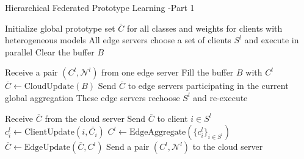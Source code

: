 \documentclass{article}
\begin{document}
\begin{algorithm}[H]
    \caption{Hierarchical Federated Prototype Learning -Part 1}
    \begin{algorithmic}[1]

        \State Initialize global prototype set \( \bar{C}\) for all classes and weights for clients with heterogeneous models
        \State All edge servers choose a set of clients $S^l$ and execute in parallel
        \State Clear the buffer \(B\)

        \State Receive a pair \( (C^l, \mathcal{N}^l) \) from one edge server
        \State Fill the buffer \(B\) with \( C^l \)
        \EndWhile
        \State \( \bar{C} \gets \text{CloudUpdate}(B) \)
        \State Send \( \bar{C} \) to edge servers participating in the current global aggregation
        \State These edge servers rechoose $S^l$ and re-execute
        \EndFor
        \EndProcedure

        \State Receive \( \bar{C} \) from the cloud server
         
        \State Send \( \bar{C} \) to client \( i \in S^{l} \)
        \State \( c^l_i \gets \text{ClientUpdate}(i, \bar{C_i}) \)
        \EndFor
        \State \( C^l \gets \text{EdgeAggregate}(\{ c^l_i \}_{i \in S^{l}}) \)
        \State \( \bar{C} \gets \text{EdgeUpdate}(\bar{C}, C^l) \) 
        \EndFor
        \State Send a pair \( (C^l, \mathcal{N}^l) \) to the cloud server
        \EndProcedure
    \end{algorithmic}
\end{algorithm}

\end{document}
